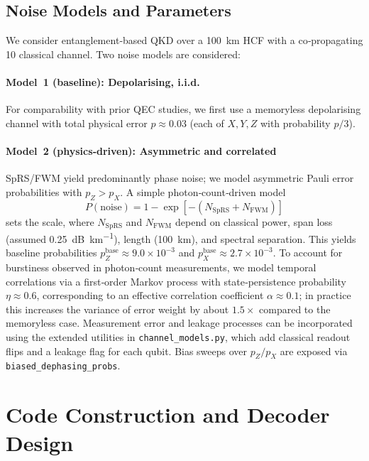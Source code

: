 \documentclass[conference]{IEEEtran}
\begin{document}
    \subsection{Noise Models and Parameters}\label{sec:noise_models}
    We consider entanglement‑based QKD over a \SI{100}{\kilo\meter} HCF with a co‑propagating \SI{10}{\dBm} classical 
channel.  Two noise models are considered:

    \paragraph*{Model 1 (baseline): Depolarising, i.i.d.}  For comparability with prior QEC studies, we first use a 
memoryless depolarising channel with total physical error $p\approx 0.03$ (each of $X,Y,Z$ with probability $p/3$).

    \paragraph*{Model 2 (physics‑driven): Asymmetric and correlated}  SpRS/FWM yield predominantly phase noise; we model
  asymmetric Pauli error probabilities with $p_Z>p_X$.  A simple photon‑count‑driven model
    \begin{equation}
    P(\text{noise})=1-\exp[-(N_{\mathrm{SpRS}}+N_{\mathrm{FWM}})]
    \end{equation}
    sets the scale, where $N_{\mathrm{SpRS}}$ and $N_{\mathrm{FWM}}$ depend on classical power, span loss (assumed 
\SI{0.25}{\dB\per\kilo\meter}), length (\SI{100}{\kilo\meter}), and spectral separation.  This yields baseline 
probabilities $p_Z^{\mathrm{base}}\approx 9.0\times 10^{-3}$ and $p_X^{\mathrm{base}}\approx 2.7\times 10^{-3}$.  To 
account for burstiness observed in photon‑count measurements, we model temporal correlations via a first‑order Markov 
process with state‑persistence probability $\eta\approx 0.6$, corresponding to an effective correlation coefficient 
    $\alpha\approx 0.1$; in practice this increases the variance of error weight by about $1.5\times$ compared to the
    memoryless case.
    Measurement error and leakage processes can be incorporated using the
    extended utilities in \texttt{channel\_models.py}, which add classical
    readout flips and a leakage flag for each qubit.  Bias sweeps over
    $p_Z/p_X$ are exposed via \texttt{biased\_dephasing\_probs}.

    \section{Code Construction and Decoder Design}
\end{document}
